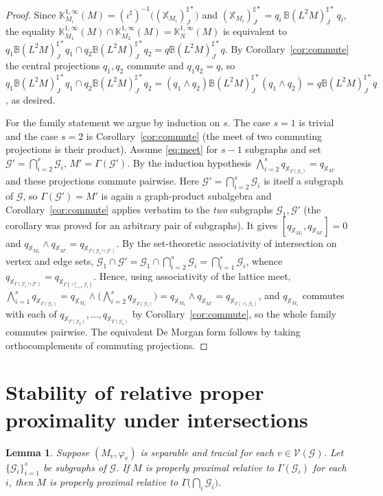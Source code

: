 \documentclass[a4paper, 11pt, reqno]{amsart}
\numberwithin{equation}{section}
\theoremstyle{plain}
\newtheorem{lemma}[thm]{Lemma}
\theoremstyle{remark}
\theoremstyle{definition}
\newcommand{\B}{\mathbb{B}}
\newcommand{\KKK}{{\mathbb K}}
\newcommand{\XX}{{\mathbb{X}}}
\newcommand{\VV}{{\mathcal V}}
\newcommand{\GG}{{\mathcal G}}
\begin{document}
\begin{proof}
Since $\KKK^{1,\infty}_{M_i}(M)=(\iota^\sharp)^{-1}\big((\XX_{M_i})^{\sharp*}_J\big)$ and $(\XX_{M_i})^{\sharp*}_J=q_i\,\B(L^2M)^{\sharp*}_J\,q_i$, the equality $\KKK^{1,\infty}_{M_1}(M)\cap\KKK^{1,\infty}_{M_2}(M)=\KKK^{1,\infty}_{N}(M)$ is equivalent to $q_1\B(L^2M)^{\sharp*}_Jq_1\cap q_2\B(L^2M)^{\sharp*}_Jq_2=q\B(L^2M)^{\sharp*}_Jq$. By Corollary~\ref{cor:commute} the central projections $q_1,q_2$ commute and $q_1q_2=q$, so $q_1\B(L^2M)^{\sharp*}_Jq_1\cap q_2\B(L^2M)^{\sharp*}_Jq_2=(q_1\wedge q_2)\B(L^2M)^{\sharp*}_J(q_1\wedge q_2)=q\B(L^2M)^{\sharp*}_Jq$, as desired.

For the family statement we argue by induction on $s$. The case $s=1$ is trivial and the case $s=2$ is Corollary~\ref{cor:commute} (the meet of two commuting projections is their product). Assume \eqref{eq:meet} for $s-1$ subgraphs and set $\GG'=\bigcap_{i=2}^s\GG_i$, $M'=\Gamma(\GG')$. By the induction hypothesis $\bigwedge_{i=2}^s q_{\XX_{\Gamma(\GG_i)}}=q_{\XX_{M'}}$ and these projections commute pairwise. Here $\GG'=\bigcap_{i=2}^s\GG_i$ is itself a subgraph of $\GG$, so $\Gamma(\GG')=M'$ is again a graph-product subalgebra and Corollary~\ref{cor:commute} applies verbatim to the \emph{two} subgraphs $\GG_1,\GG'$ (the corollary was proved for an arbitrary pair of subgraphs). It gives $[q_{\XX_{M_1}},q_{\XX_{M'}}]=0$ and $q_{\XX_{M_1}}\wedge q_{\XX_{M'}}=q_{\XX_{\Gamma(\GG_1\cap\GG')}}$. By the set-theoretic associativity of intersection on vertex and edge sets, $\GG_1\cap\GG'=\GG_1\cap\bigcap_{i=2}^s\GG_i=\bigcap_{i=1}^s\GG_i$, whence $q_{\XX_{\Gamma(\GG_1\cap\GG')}}=q_{\XX_{\Gamma(\cap_{i=1}^s\GG_i)}}$. Hence, using associativity of the lattice meet, $\bigwedge_{i=1}^s q_{\XX_{\Gamma(\GG_i)}}=q_{\XX_{M_1}}\wedge\big(\bigwedge_{i=2}^s q_{\XX_{\Gamma(\GG_i)}}\big)=q_{\XX_{M_1}}\wedge q_{\XX_{M'}}=q_{\XX_{\Gamma(\cap_i\GG_i)}}$, and $q_{\XX_{M_1}}$ commutes with each of $q_{\XX_{\Gamma(\GG_2)}},\dots,q_{\XX_{\Gamma(\GG_s)}}$ by Corollary~\ref{cor:commute}, so the whole family commutes pairwise. The equivalent De Morgan form follows by taking orthocomplements of commuting projections.
\end{proof}

\section{Stability of relative proper proximality under intersections}

\begin{lemma}\label{lem:intersect-pp}
Suppose $(M_v,\varphi_v)$ is separable and tracial for each $v\in\VV(\GG)$. Let $\{\GG_i\}_{i=1}^s$ be subgraphs of $\GG$. If $M$ is properly proximal relative to $\Gamma(\GG_i)$ for each $i$, then $M$ is properly proximal relative to $\Gamma\big(\bigcap_i\GG_i\big)$.
\end{lemma}
\end{document}
